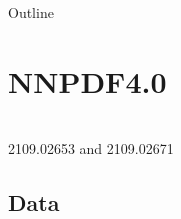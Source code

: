 \begin{frame}{Outline}
  \tableofcontents
\end{frame}



{
\AtBeginSection{}
\section{NNPDF4.0}
\begin{frame}
  \begin{center}
    \\
    \vspace*{0.3cm} {\small 2109.02653 and 2109.02671}
  \end{center}
\end{frame}
}


\subsection{Data}



